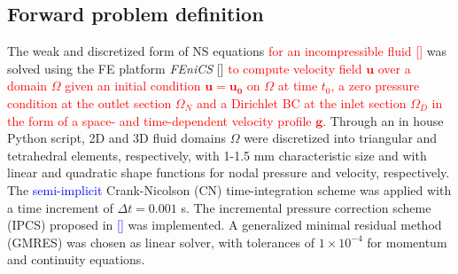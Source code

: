%
%
%
%

\subsection*{Forward problem definition}
The weak and discretized form of NS equations \textcolor{red}{for an incompressible fluid [\cite{Stokes2009}]} was solved using the FE platform \emph{FEniCS} [\cite{Alnaes2015}] \textcolor{red}{to compute velocity field $\textbf{u}$ over a domain $\Omega$ given an initial condition \(\mathbf{u}=\mathbf{u_0}\) on $\Omega$ at time $t_0$, a zero pressure condition at the outlet section $\Omega_N$ and a Dirichlet BC at the inlet section $\Omega_D$ in the form of a space- and time-dependent velocity profile $\textbf{g}$.} Through an in house Python script, 2D and 3D fluid domains $\Omega$ were discretized into triangular and tetrahedral elements, respectively, with 1-1.5 mm characteristic size and with linear and quadratic shape functions for nodal pressure and velocity, respectively. The \textcolor{blue}{semi-implicit} Crank-Nicolson (CN) time-integration scheme was applied with a time increment of $\Delta t = 0.001$ s. The incremental pressure correction scheme (IPCS) proposed in \textcolor{blue}{[\cite{Goda1979}]} was implemented. A generalized minimal residual method (GMRES) was chosen as linear solver, with tolerances of $1 \times 10^{-4}$ for momentum and continuity equations.

